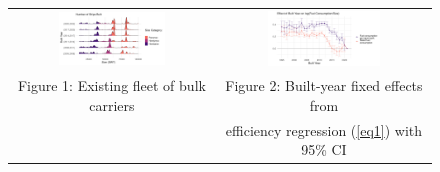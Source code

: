 \documentclass[hidelinks, 12pt,letterpaper]{article}
\begin{document}
\begin{figure}[t] 
  \begin{minipage}{\linewidth}
    \centering
    \begin{tabular}{cc}
 \hspace{-1cm}    \includegraphics[width = 0.55\textwidth]{WFR_Bulkers_Exploration_Size_Built_horizontalridges.png}
  & \hspace{-0.7cm}    \includegraphics[width=0.55\textwidth]{Efficiency_Regression_Size_Built_coefs_1and3_ggplot.png}\\
\hspace{-1cm}     \footnotesize{ Figure 1: Existing fleet of bulk carriers }&\hspace{-0.7cm}  \footnotesize{Figure 2: Built-year fixed effects from} \\
  \hspace{-1cm}        &\hspace{-0.7cm} \footnotesize{efficiency regression (\ref{eq1}) with 95\% CI}
    \end{tabular} \vspace{-0.4cm}
  \end{minipage}
\end{figure}
\end{document}
